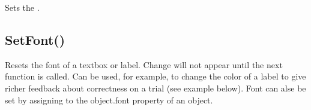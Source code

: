\documentclass[letterpaper,10pt,english]{sphinxmanual}
\begin{document}
\sphinxAtStartPar
{}

\sphinxAtStartPar
Sets the .

\sphinxAtStartPar
{}

\begin{sphinxVerbatim}[commandchars=\\\{\}]
\end{sphinxVerbatim}

\sphinxAtStartPar
{}

\begin{sphinxVerbatim}[commandchars=\\\{\}]
\end{sphinxVerbatim}

\sphinxAtStartPar
{}

\sphinxAtStartPar
{}

\ignorespaces 

\subsection{SetFont()}
\label{\detokenize{reference/peblobjects:setfont}}\label{\detokenize{reference/peblobjects:index-49}}
\sphinxAtStartPar
{}

\sphinxAtStartPar
{}

\sphinxAtStartPar
Resets the font of a textbox or label.  Change will   not appear until the next  function is called.  Can be   used, for example, to change the color of a label to give richer   feedback about correctness on a trial (see example below).  Font can alse be set by assigning to the object.font property of an object.

\sphinxAtStartPar
{}

\begin{sphinxVerbatim}[commandchars=\\\{\}]
\end{sphinxVerbatim}
\end{document}

